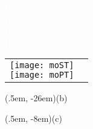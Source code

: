 \documentclass[varwidth=12em]{standalone}
\begin{document}
	\textcolor{white}{Hi\\Hi\\Hi\\Hi}
	
	\begin{tabular}[c]{p{12em}p{5em}}
		\shortstack[c]{
			\texttt{[image: moST]} \\[4cm]
		\texttt{[image: moPT]}}
		& 
		\shortstack[c]{}
	\end{tabular}
	\begin{textblock*}{5em}(.5em, -26em)\sf \huge{(b)}\end{textblock*}
	\begin{textblock*}{5em}(.5em, -8em)\sf \huge{(c)}\end{textblock*}
\end{document}

